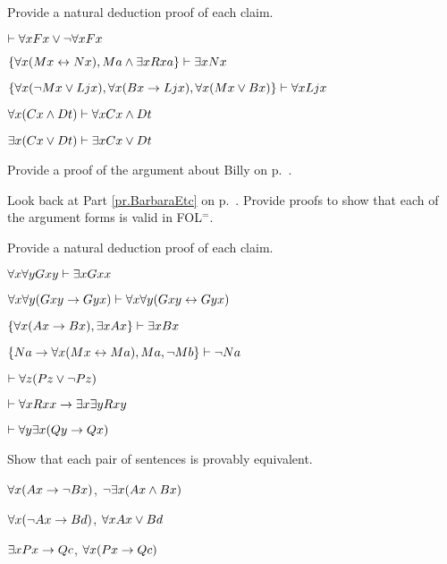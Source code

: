 \solutions
\problempart
\label{pr.someFOL$^=$proofs}
Provide a natural deduction proof of each claim.
\begin{earg}
\item $\vdash \forall x Fx \vee \neg \forall x Fx$
\item $\{\forall x(Mx \leftrightarrow Nx), Ma\wedge\exists x Rxa\}\vdash \exists x Nx$
\item $\{\forall x(\neg Mx \vee Ljx), \forall x(Bx\rightarrow Ljx), \forall x(Mx\vee Bx)\}\vdash \forall xLjx$
\item $\forall x(Cx \wedge Dt)\vdash \forall xCx \wedge Dt$
\item $\exists x(Cx \vee Dt)\vdash \exists x Cx \vee Dt$
\end{earg}

\problempart
Provide a proof of the argument about Billy on p.~\pageref{surgeon2}.



\problempart
\label{pr.BarbaraEtc.proof1}
Look back at Part \ref{pr.BarbaraEtc} on p.~\pageref{pr.BarbaraEtc}. Provide proofs to show that each of the argument forms is valid in FOL$^=$.




\solutions
\problempart
\label{pr.FOL$^=$proofsNDe}
Provide a natural deduction proof of each claim.
\begin{earg}
\item $\forall x \forall y Gxy\vdash\exists x Gxx$
\item $\forall x \forall y (Gxy \rightarrow Gyx) \vdash \forall x\forall y (Gxy \leftrightarrow Gyx)$
\item $\{\forall x(Ax\rightarrow Bx), \exists x Ax\} \vdash \exists x Bx$
\item $\{Na \rightarrow \forall x(Mx \leftrightarrow Ma), Ma, \neg Mb\}\vdash \neg Na$
\item $\vdash\forall z (Pz \vee \neg Pz)$
\item $\vdash\forall x Rxx\rightarrow \exists x \exists y Rxy$
\item $\vdash\forall y \exists x (Qy \rightarrow Qx)$
\end{earg}



\problempart
Show that each pair of sentences is provably equivalent.
\begin{earg}
\item $\forall x (Ax\rightarrow \neg Bx)$, $\neg\exists x(Ax \wedge Bx)$
\item $\forall x (\neg Ax\rightarrow Bd)$, $\forall x Ax \vee Bd$
\item $\exists x Px \rightarrow Qc$, $\forall x (Px \rightarrow Qc)$
\end{earg}



